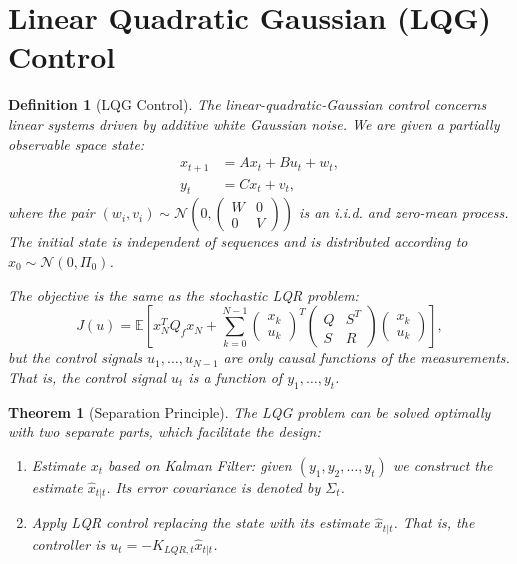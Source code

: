 \documentclass[a4 paper]{article}
\numberwithin{equation}{section}
\theoremstyle{boldStyle}
\theoremstyle{boldBlueStyle}
\theoremstyle{boldPurpleStyle}
\newtheorem{theorem}{Theorem}[section]
\theoremstyle{boldRedStyle}
\newtheorem{definition}{Definition}[section]
\theoremstyle{boldGreenStyle}
\begin{document}
\section{Linear Quadratic Gaussian (LQG) Control}


\begin{definition}[LQG Control]
  The linear-quadratic-Gaussian control concerns linear systems driven by additive white Gaussian noise. We are given a partially observable space state:
  \begin{align}
      x_{t+1} &= A x_t + B u_t + w_t, \\
      y_t &= C x_t + v_t,
  \end{align}
  where the pair \( (w_i, v_i) \sim \mathcal{N}\left(0, \begin{pmatrix}
  W & 0 \\
  0 & V
  \end{pmatrix}\right) \) is an i.i.d. and zero-mean process. The initial state is independent of sequences and is distributed according to \( x_0 \sim \mathcal{N}(0, \Pi_0) \).
  
  The objective is the same as the stochastic LQR problem:
  \[
  J(u) = \mathbb{E} \left[ x_N^T Q_f x_N + \sum_{k=0}^{N-1} \begin{pmatrix}
  x_k \\
  u_k
  \end{pmatrix}^T \begin{pmatrix}
  Q & S^T \\
  S & R
  \end{pmatrix} \begin{pmatrix}
  x_k \\
  u_k
  \end{pmatrix} \right],
  \]
  but the control signals \( u_1, \ldots, u_{N-1} \) are only causal functions of the measurements. That is, the control signal \( u_t \) is a function of \( y_1, \ldots, y_t \).
\end{definition}


\begin{theorem}[Separation Principle]
  The LQG problem can be solved optimally with two separate parts, which facilitate the design:
  \begin{enumerate}
      \item Estimate \( x_t \) based on Kalman Filter: given \((y_1, y_2, \ldots, y_t)\) we construct the estimate \( \hat{x}_{t|t} \). Its error covariance is denoted by \( \Sigma_t \).
      \item Apply LQR control replacing the state with its estimate \( \hat{x}_{t|t} \). That is, the controller is \( u_t = -K_{LQR,t} \hat{x}_{t|t} \).
  \end{enumerate}
\end{theorem}
\end{document}
